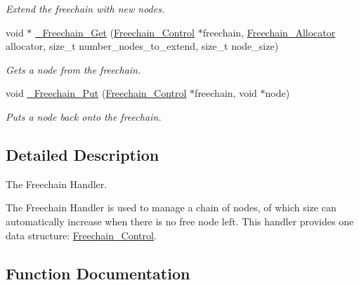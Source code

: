 \begin{DoxyCompactItemize}
\begin{DoxyCompactList}\small\item\em Extend the freechain with new nodes. \end{DoxyCompactList}\item 
void $\ast$ \mbox{\hyperlink{group__RTEMSScoreFreechain_ga2a213d3f834d14e4dae74f7ff7b9f73d}{\+\_\+\+Freechain\+\_\+\+Get}} (\mbox{\hyperlink{structFreechain__Control}{Freechain\+\_\+\+Control}} $\ast$freechain, \mbox{\hyperlink{group__RTEMSScoreFreechain_ga1e28d76c4121a3b08517d45eab453ecc}{Freechain\+\_\+\+Allocator}} allocator, size\+\_\+t number\+\_\+nodes\+\_\+to\+\_\+extend, size\+\_\+t node\+\_\+size)
\begin{DoxyCompactList}\small\item\em Gets a node from the freechain. \end{DoxyCompactList}\item 
void \mbox{\hyperlink{group__RTEMSScoreFreechain_ga787b2c73c267bbd97973e476ebeabc80}{\+\_\+\+Freechain\+\_\+\+Put}} (\mbox{\hyperlink{structFreechain__Control}{Freechain\+\_\+\+Control}} $\ast$freechain, void $\ast$node)
\begin{DoxyCompactList}\small\item\em Puts a node back onto the freechain. \end{DoxyCompactList}\end{DoxyCompactItemize}


\subsection{Detailed Description}
The Freechain Handler. 

The Freechain Handler is used to manage a chain of nodes, of which size can automatically increase when there is no free node left. This handler provides one data structure\+: \mbox{\hyperlink{structFreechain__Control}{Freechain\+\_\+\+Control}}. 

\subsection{Function Documentation}
\mbox{\label{group__RTEMSScoreFreechain_ga6d2f5e4f088a9c17928f2fa925a1d4f6}} 
